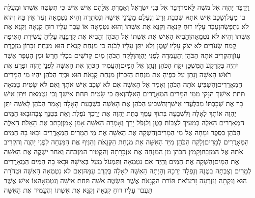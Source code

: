 \documentclass[../main/main.tex]{subfiles}
\begin{document}
\begin{multicols*}{\ncols}
וַיְדַבֵּר יַהְוֶה אֶל מֹשֶׁה לֵּאמֹר\PreVerseSpace{}דַּבֵּר אֶל בְּנֵי יִשְׂרָאֵל וְאָמַרְתָּ אֲלֵהֶם אִישׁ אִישׁ כִּי תִשְׂטֶה אִשְׁתּוֹ וּמָעֲלָה בוֹ מָעַל\PreVerseSpace{}וְשָׁכַב אִישׁ אֹתָהּ שִׁכְבַת זֶרַע וְנֶעְלַם מֵעֵינֵי אִישָׁהּ וְנִסְתְּרָה וְהִיא נִטְמָאָה וְעֵד אֵין בָּהּ וְהוּא לֹא נִתְפָּשָׂה\PreVerseSpace{}וְעָבַר עָלָיו רוּחַ קִנְאָה וְקִנֵּא אֶת אִשְׁתּוֹ וְהוּא נִטְמָאָה אוֹ עָבַר עָלָיו רוּחַ קִנְאָה וְקִנֵּא אֶת אִשְׁתּוֹ וְהִיא לֹא נִטְמָאָה\PreVerseSpace{}וְהֵבִיא הָאִישׁ אֶת אִשְׁתּוֹ אֶל הַכֹּהֵן וְהֵבִיא אֶת קָרְבָּנָהּ עָלֶיהָ עֲשִׂירִת הָאֵיפָה קֶמַח שְׂעֹרִים לֹא יִצֹק עָלָיו שֶׁמֶן וְלֹא יִתֵּן עָלָיו לְבֹנָה כִּי מִנְחַת קְנָאֹת הוּא מִנְחַת זִכָּרוֹן מַזְכֶּרֶת עָוֺן\PreVerseSpace{}וְהִקְרִיב אֹתָהּ הַכֹּהֵן וְהֶעֱמִדָהּ לִפְנֵי יַהְוֶה\PreVerseSpace{}וְלָקַח הַכֹּהֵן מַיִם קְדֹשִׁים בִּכְלִי חָרֶשׂ וּמִן הֶעָפָר אֲשֶׁר יִהְיֶה בְּקַרְקַע הַמִּשְׁכָּן יִקַּח הַכֹּהֵן וְנָתַן אֶל הַמָּיִם\PreVerseSpace{}וְהֶעֱמִיד הַכֹּהֵן אֶת הָאִשָּׁה לִפְנֵי יַהְוֶה וּפָרַע אֶת רֹאשׁ הָאִשָּׁה וְנָתַן עַל כַּפֶּיהָ אֵת מִנְחַת הַזִּכָּרוֹן מִנְחַת קְנָאֹת הוּא וּבְיַד הַכֹּהֵן יִהְיוּ מֵי הַמָּרִים הַמְאָרֲרִים\PreVerseSpace{}וְהִשְׁבִּיעַ אֹתָהּ הַכֹּהֵן וְאָמַר אֶל הָאִשָּׁה אִם לֹא שָׁכַב אִישׁ אֹתָךְ וְאִם לֹא שָׂטִית טֻמְאָה תַּחַת אִישֵׁךְ הִנָּקִי מִמֵּי הַמָּרִים הַמְאָרֲרִים הָאֵלֶּה\PreVerseSpace{}וְאַתְּ כִּי שָׂטִית תַּחַת אִישֵׁךְ וְכִי נִטְמֵאת וַיִּתֵּן אִישׁ בָּךְ אֶת שְׁכָבְתּוֹ מִבַּלְעֲדֵי אִישֵׁךְ\PreVerseSpace{}וְהִשְׁבִּיעַ הַכֹּהֵן אֶת הָאִשָּׁה בִּשְׁבֻעַת הָאָלָה וְאָמַר הַכֹּהֵן לָאִשָּׁה יִתֵּן יַהְוֶה אוֹתָךְ לְאָלָה וְלִשְׁבֻעָה בְּתוֹךְ עַמֵּךְ בְּתֵת יַהְוֶה אֶת יְרֵכֵךְ נֹפֶלֶת וְאֶת בִּטְנֵךְ צָבָה\PreVerseSpace{}וּבָאוּ הַמַּיִם הַמְאָרְרִים הָאֵלֶּה בְּמֵעַיִךְ לִצְבּוֹת\SubEnd{} בֶּטֶן וְלִנְפֹּל\SubEnd{} יָרֵךְ וְאָמְרָה הָאִשָּׁה אָמֵן אָמֵן\PreVerseSpace{}וְכָתַב אֶת הָאָלֹת הָאֵלֶּה הַכֹּהֵן בַּסֵּפֶר וּמָחָה אֶל מֵי הַמָּרִים\PreVerseSpace{}וְהִשְׁקָה אֶת הָאִשָּׁה אֶת מֵי הַמָּרִים הַמְאָרֲרִים וּבָאוּ בָהּ הַמַּיִם הַמְאָרֲרִים לְמָרִים\PreVerseSpace{}וְלָקַח הַכֹּהֵן מִיַּד הָאִשָּׁה אֵת מִנְחַת הַקְּנָאֹת וְהֵנִיף אֶת הַמִּנְחָה לִפְנֵי יַהְוֶה וְהִקְרִיב אֹתָהּ אֶל הַמִּזְבֵּחַ\PreVerseSpace{}וְקָמַץ הַכֹּהֵן מִן הַמִּנְחָה אֶת אַזְכָּרָתָהּ וְהִקְטִיר הַמִּזְבֵּחָה וְאַחַר יַשְׁקֶה אֶת הָאִשָּׁה אֶת הַמָּיִם\PreVerseSpace{}וְהִשְׁקָהּ אֶת הַמַּיִם וְהָיָה\SubEnd{} אִם נִטְמְאָה וַתִּמְעֹל מַעַל בְּאִישָׁהּ וּבָאוּ בָהּ הַמַּיִם הַמְאָרֲרִים לְמָרִים וְצָבְתָה בִטְנָהּ וְנָפְלָה יְרֵכָהּ וְהָיְתָה הָאִשָּׁה לְאָלָה בְּקֶרֶב עַמָּהּ\PreVerseSpace{}וְאִם לֹא נִטְמְאָה הָאִשָּׁה וּטְהֹרָה הוּא וְנִקְּתָה וְנִזְרְעָה זָרַע\PreVerseSpace{}זֹאת תּוֹרַת הַקְּנָאֹת אֲשֶׁר תִּשְׂטֶה אִשָּׁה תַּחַת אִישָׁהּ וְנִטְמָאָה\PreVerseSpace{}אוֹ אִישׁ אֲשֶׁר תַּעֲבֹר עָלָיו רוּחַ קִנְאָה וְקִנֵּא אֶת אִשְׁתּוֹ וְהֶעֱמִיד אֶת הָאִשָּׁה 
\end{multicols*}
\end{document}
